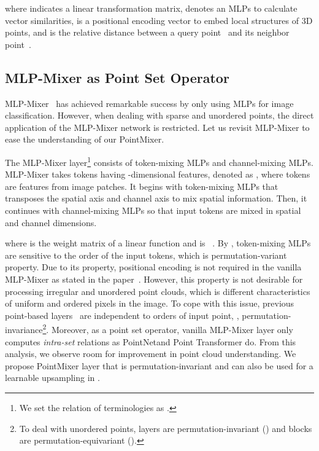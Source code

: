 where  indicates a linear transformation matrix,  denotes an MLPs to calculate vector similarities, 
 is a positional encoding vector to embed local structures of 3D points,
and  is the relative distance between a query point~ and its neighbor point~. 

 
\subsection{MLP-Mixer as Point Set Operator}
\label{subsec:MLP-Mixer as Point Set Operator}
MLP-Mixer~\cite{mlp-mixer} has achieved remarkable success by only using MLPs for image classification. However, when dealing with sparse and unordered points, the direct application of the MLP-Mixer network is restricted. Let us revisit MLP-Mixer to ease the understanding of our PointMixer.



The MLP-Mixer layer\footnote{We set the relation of terminologies as .} consists of token-mixing MLPs and channel-mixing MLPs. MLP-Mixer takes  tokens having -dimensional features, denoted as , where tokens are features from image patches. It begins with token-mixing MLPs that transposes the spatial axis and channel axis to mix spatial information. Then, it continues with channel-mixing MLPs so that input tokens are mixed in spatial and channel dimensions. 


where  is the weight matrix of a linear function and  is ~\cite{GELUs}. By , token-mixing MLPs are sensitive to the order of the input tokens, which is permutation-variant property. Due to its property, positional encoding is not required in the vanilla MLP-Mixer as stated in the paper~\cite{mlp-mixer}.
However, this property is not desirable for processing irregular and unordered point clouds, which is different characteristics of uniform and ordered pixels in the image. To cope with this issue, previous point-based layers~\cite{pointnet++,point-transformer} are independent to orders of input point, \ie, permutation-invariance\footnote{To deal with unordered points, layers are permutation-invariant () and blocks are permutation-equivariant ().}.
Moreover, as a point set operator, vanilla MLP-Mixer layer only computes \emph{intra-set} relations as PointNet\plusplus and Point Transformer do. From this analysis, we observe room for improvement in point cloud understanding. We propose PointMixer layer that is permutation-invariant and can also be used for a learnable upsampling in .
 

